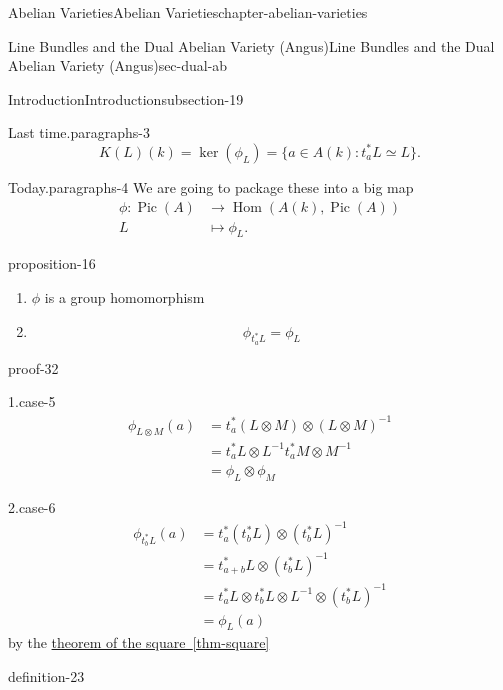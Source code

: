 \documentclass[oneside,10pt,]{book}
\numberwithin{equation}{section}
\DeclareMathOperator{\Hom}{Hom}
\DeclareMathOperator{\Pic}{Pic}
\newcommand{\amp}{&}
\begin{document}
\begin{chapterptx}{Abelian Varieties}{}{Abelian Varieties}{}{}{chapter-abelian-varieties}
\begin{sectionptx}{Line Bundles and the Dual Abelian Variety (Angus)}{}{Line Bundles and the Dual Abelian Variety (Angus)}{}{}{sec-dual-ab}
\begin{subsectionptx}{Introduction}{}{Introduction}{}{}{subsection-19}
\begin{paragraphs}{Last time.}{paragraphs-3}
\begin{equation*}
K(L)(k) = \ker(\phi_L) = \{a\in A(k) : t_a^* L \simeq L\}\text{.}
\end{equation*}
%
\end{paragraphs}%
\begin{paragraphs}{Today.}{paragraphs-4}%
\hypertarget{p-166}{}%
We are going to package these into a big map%
\begin{align*}
\phi\colon \Pic(A)\amp\to \Hom(A(k), \Pic(A))\\
L \amp\mapsto \phi_L\text{.}
\end{align*}
%
\begin{proposition}{}{}{proposition-16}%
\hypertarget{p-167}{}%
\leavevmode%
\begin{enumerate}
\item\hypertarget{li-27}{}\(\phi\) is a group homomorphism%
\item\hypertarget{li-28}{}%
\begin{equation*}
\phi_{t_a^* L}  = \phi_L
\end{equation*}
%
\end{enumerate}
%
\end{proposition}
\begin{proofptx}{}{proof-32}
\begin{case}
{}{1.}{case-5}
\hypertarget{p-168}{}%
%
\begin{align*}
\phi_{L\otimes M}(a) \amp = t_a^*(L\otimes M) \otimes(L\otimes M)^{-1}\\
\amp = t_a^*L\otimes L^{-1} t_a^*M\otimes M^{-1}\\
\amp = \phi_L\otimes \phi_M
\end{align*}
%
\end{case}
\begin{case}
{}{2.}{case-6}
\hypertarget{p-169}{}%
%
\begin{align*}
\phi_{t_b^*L}(a) \amp = t_a^*(t_b^*L) \otimes(t_b^*L)^{-1}\\
\amp = t_{a+b}^*L \otimes(t_b^*L)^{-1}\\
\amp = t_{a}^*L \otimes t_b^*L \otimes L^{-1} \otimes (t_b^*L)^{-1}\\
\amp = \phi_L(a)
\end{align*}
by  the \hyperref[thm-square]{theorem of the square~\ref{thm-square}}%
\end{case}
\end{proofptx}
\begin{definition}{}{definition-23}%
\hypertarget{p-170}{}%
%
\begin{align*}

\end{align*}
\end{definition}
\end{paragraphs}
\end{subsectionptx}
\end{sectionptx}
\end{chapterptx}
\end{document}
